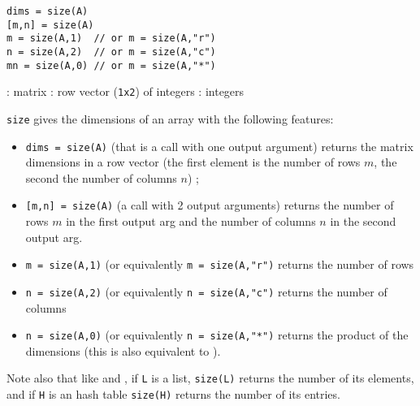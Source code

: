 
\begin{mandesc}
\end{mandesc}
\begin{calling_sequence}
\begin{verbatim}
dims = size(A)
[m,n] = size(A)
m = size(A,1)  // or m = size(A,"r")
n = size(A,2)  // or m = size(A,"c")
mn = size(A,0) // or m = size(A,"*")   
\end{verbatim}
\end{calling_sequence}

\begin{parameters}
  \begin{varlist}
    : matrix
    :  row vector (\verb+1x2+) of integers
    : integers
  \end{varlist}
\end{parameters}

\begin{mandescription}
\verb+size+ gives the dimensions of an array with the following features:
\begin{itemize}
  \item \verb!dims = size(A)! (that is a call with one output argument) returns the matrix dimensions in a row vector 
        (the first element is the number of rows $m$, the second the number of columns $n$) ;
  \item \verb![m,n] = size(A)! (a call with 2 output arguments) returns the number of rows $m$ in the first output arg
        and the number of columns $n$ in the second output arg.
  \item \verb!m = size(A,1)! (or equivalently \verb!m = size(A,"r")! returns the number of rows
  \item \verb!n = size(A,2)! (or equivalently \verb!n = size(A,"c")! returns the number of columns
  \item \verb!n = size(A,0)! (or equivalently \verb!n = size(A,"*")! returns the product of the dimensions (this is
        also equivalent to ).
\end{itemize}

Note also that like  and , if \verb+L+ is a list, 
\verb+size(L)+ returns the number of its elements, and if \verb+H+ is an hash table \verb+size(H)+ 
returns the number of its entries.
\end{mandescription}

